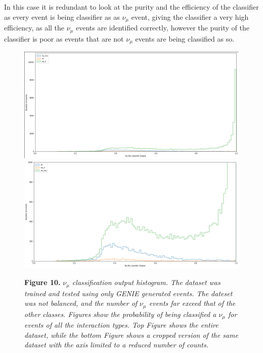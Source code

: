 \noindent In this case it is redundant to look at the purity and the efficiency of the classifier as every event is being classifier as as $\nu_\mu$ event, giving the classifier a very high efficiency, as all the $\nu_\mu$ events are identified correctly, however the purity of the classifier is poor as events that are not $\nu_\mu$ events are being classified as so. \medskip

\begin{figure}[t!]
 \centering
 \includegraphics[width=160mm]{genie/NUMU.png}
 \includegraphics[width=160mm]{genie/NUMUZOOM.png} 
 
 \textbf{Figure 10.} \textit{$\nu_\mu$ classification output histogram. The dataset was trained and tested using only GENIE generated events. The dateset was not balanced, and the number of $\nu_\mu$ events far exceed that of the other classes.  Figures show the probability of being classified a $\nu_\mu$ for events of all the interaction types. Top Figure shows the entire dataset, while the bottom Figure shows a cropped version of the same dataset with the axis limited to a reduced number of counts.}
\end{figure}

